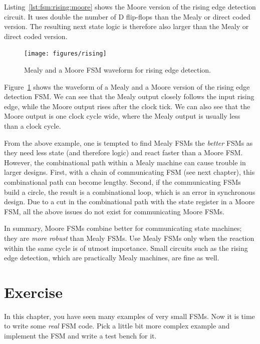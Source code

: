 \documentclass[%
    10pt,
    headinclude, footexclude,
    openright, %
    notitlepage,
    cleardoubleempty,
    headsepline,
    pointlessnumbers,
    bibtotoc, idxtotoc,
    ]{scrbook}
\begin{document}

Listing~\ref{lst:fsm:rising:moore} shows the Moore version of the rising edge detection
circuit. It uses double the number of D flip-flops than the Mealy or direct
coded version. The resulting next state logic is therefore also larger
than the Mealy or direct coded version.

\begin{figure}
  \centering
  \texttt{[image: figures/rising]}
  \caption{Mealy and a  Moore FSM waveform for rising edge detection.}
  \label{fig:rising}
\end{figure}

Figure~\ref{fig:rising} shows the waveform of a Mealy and a  Moore version
of the rising edge detection FSM. We can see that the Mealy output closely
follows the input rising edge, while the Moore output rises after the clock tick.
We can also see that the Moore output is one clock cycle wide, where the Mealy
output is usually less than a clock cycle.

From the above example, one is tempted to find Mealy FSMs the \emph{better}
FSMs as they need less state (and therefore logic) and react faster than a Moore FSM.
However, the combinational path within a Mealy machine can cause trouble in
larger designs. First, with a chain of communicating FSM (see next chapter), this
combinational path can become lengthy. Second, if the communicating FSMs build
a circle, the result is a combinational loop, which is an error in synchronous design.
Due to a cut in the combinational path with the state register in a Moore FSM,
all the above issues do not exist for communicating Moore FSMs.

In summary, Moore FSMs combine better for communicating state machines; they
are \emph{more robust} than Mealy FSMs. Use Mealy FSMs only when the reaction within the same
cycle is of utmost importance. Small circuits such as the rising edge detection,
which are practically Mealy machines, are fine as well.

\section{Exercise}

In this chapter, you have seen many examples of very small FSMs.
Now it is time to write some \emph{real} FSM code.
Pick a little bit more complex example and implement the FSM and
write a test bench for it.
\end{document}
